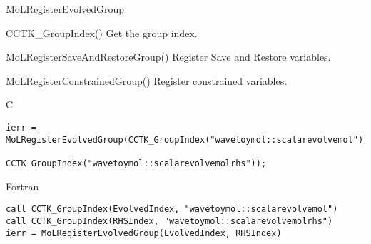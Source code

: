 \begin{FunctionDescription}{MoLRegisterEvolvedGroup}
  \begin{SeeAlsoSection}
    \begin{SeeAlso}{CCTK\_GroupIndex()}
      Get the group index.
    \end{SeeAlso}
    \begin{SeeAlso}{MoLRegisterSaveAndRestoreGroup()}
      Register Save and Restore variables.
    \end{SeeAlso}
    \begin{SeeAlso}{MoLRegisterConstrainedGroup()}
      Register constrained variables.
    \end{SeeAlso}
  \end{SeeAlsoSection}

  \begin{ExampleSection}
    \begin{Example}{C}
\begin{verbatim}
ierr = MoLRegisterEvolvedGroup(CCTK_GroupIndex("wavetoymol::scalarevolvemol"),
                               CCTK_GroupIndex("wavetoymol::scalarevolvemolrhs"));
\end{verbatim}
    \end{Example}
    \begin{Example}{Fortran}
\begin{verbatim}
call CCTK_GroupIndex(EvolvedIndex, "wavetoymol::scalarevolvemol")
call CCTK_GroupIndex(RHSIndex, "wavetoymol::scalarevolvemolrhs")
ierr = MoLRegisterEvolvedGroup(EvolvedIndex, RHSIndex)
\end{verbatim}
    \end{Example}
  \end{ExampleSection}

\end{FunctionDescription}



